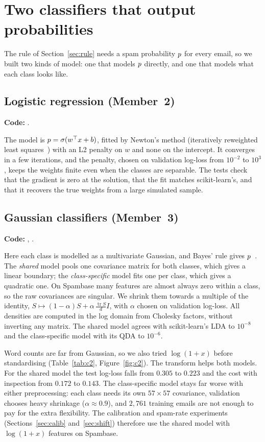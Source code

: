 \section{Two classifiers that output probabilities}
\label{sec:models}
The rule of Section~\ref{sec:rule} needs a spam probability $p$ for every email, so we built two
kinds of model: one that models $p$ directly, and one that models what each class looks like.

\subsection{Logistic regression (Member~2)}
\label{sec:logistic}
\textbf{Code:} .

The model is $p=\sigma(w^\top x+b)$, fitted by Newton's method (iteratively reweighted least
squares~\cite[Section~4.3]{bishop2006}) with an L2 penalty on $w$ and none on the intercept. It converges in a few iterations, and
the penalty, chosen on validation log-loss from $10^{-2}$ to $10^{3}$, keeps the weights finite even
when the classes are separable. The tests check that the gradient is zero at the solution, that the
fit matches scikit-learn's, and that it recovers the true weights from a large simulated sample.

\subsection{Gaussian classifiers (Member~3)}
\label{sec:gaussian}
\textbf{Code:} , .

Here each class is modelled as a multivariate Gaussian, and Bayes' rule gives
$p$~\cite[Section~4.2]{bishop2006}. The
\emph{shared} model pools one covariance matrix for both classes, which gives a linear boundary; the
\emph{class-specific} model fits one per class, which gives a quadratic one. On Spambase many features
are almost always zero within a class, so the raw covariances are singular. We shrink them towards a
multiple of the identity, $S\mapsto(1-\alpha)S+\alpha\,\tfrac{\operatorname{tr}S}{d}I$, with $\alpha$
chosen on validation log-loss. All densities are computed in the log domain from Cholesky factors,
without inverting any matrix. The shared model agrees with scikit-learn's LDA to $10^{-8}$ and the
class-specific model with its QDA to $10^{-6}$.

Word counts are far from Gaussian, so we also tried $\log(1+x)$ before standardising
(Table~\ref{tab:c2}, Figure~\ref{fig:c2}). The transform helps both models. For the shared model the
test log-loss falls from $0.305$ to $0.223$ and the cost with inspection from $0.172$ to $0.143$. The
class-specific model stays far worse with either preprocessing: each class needs its own
$57\times57$ covariance, validation chooses heavy shrinkage ($\alpha\approx0.9$), and $2{,}761$
training emails are not enough to pay for the extra flexibility. The calibration and spam-rate
experiments (Sections~\ref{sec:calib} and~\ref{sec:shift}) therefore use the shared model with
$\log(1+x)$ features on Spambase.


